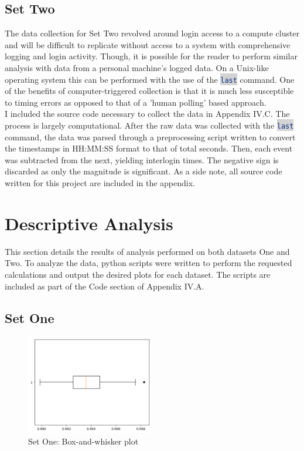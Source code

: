 \documentclass[10pt]{report}
\newcommand{\inlinecode}[2]{\colorbox{lightgray}{\lstinline[language=#1]$#2$}}
\begin{document}
\subsection*{Set Two}
\par
The data collection for Set Two revolved around login access to a compute cluster
and will be difficult to replicate without access to a system with comprehensive logging and login activity.
Though, it is possible for the reader to perform similar analysis with data from a personal machine's logged data. 
On a Unix-like operating system this can be performed with the use of the \inlinecode{Bash}{last} command. 
One of the benefits of computer-triggered collection is that it is much less susceptible to timing errors 
as opposed to that of a 'human polling' based approach. \\ I included the source code necessary to collect 
the data in Appendix IV.C. The process is largely computational. After the raw data was collected with the
\inlinecode{Bash}{last} command, the data was parsed through a preprocessing script written to convert the 
timestamps in HH:MM:SS format to that of total seconds. Then, each event was subtracted from the next, yielding 
interlogin times. The negative sign is discarded as only the magnitude is significant.
As a side note, all source code written for this project are included in the appendix.

\newpage

\section*{Descriptive Analysis}

This section details the results of analysis performed on both datasets One and Two.
To analyze the data, python scripts were written to perform the requested calculations and output the desired
plots for each dataset. The scripts are included as part of the Code section of Appendix IV.A.

\subsection*{Set One}

\begin{figure}
    \centering
    \includegraphics[width=0.50\textwidth]{results/resistor_boxplot}
    \caption{Set One: Box-and-whisker plot}
\end{figure}
\end{document}
